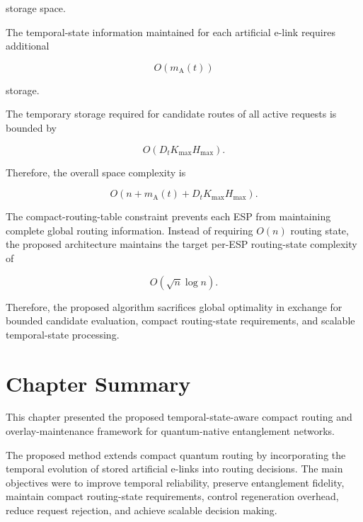 storage space.

The temporal-state information maintained for each artificial e-link requires additional

\begin{equation}
    O
    \left(
    m_{\mathrm{A}}(t)
    \right)
\end{equation}

storage.

The temporary storage required for candidate routes of all active requests is bounded by

\begin{equation}
    O
    \left(
    D_t
    K_{\max}
    H_{\max}
    \right).
\end{equation}

Therefore, the overall space complexity is

\begin{equation}
    O
    \left(
    n
    +
    m_{\mathrm{A}}(t)
    +
    D_t
    K_{\max}
    H_{\max}
    \right).
\end{equation}

The compact-routing-table constraint prevents each ESP from maintaining complete global routing information. Instead of requiring $O(n)$ routing state, the proposed architecture maintains the target per-ESP routing-state complexity of

\begin{equation}
    O
    \left(
    \sqrt{n}
    \log n
    \right).
\end{equation}

Therefore, the proposed algorithm sacrifices global optimality in exchange for bounded candidate evaluation, compact routing-state requirements, and scalable temporal-state processing.

\section{Chapter Summary}

This chapter presented the proposed temporal-state-aware compact routing and overlay-maintenance framework for quantum-native entanglement networks.

The proposed method extends compact quantum routing by incorporating the temporal evolution of stored artificial e-links into routing decisions. The main objectives were to improve temporal reliability, preserve entanglement fidelity, maintain compact routing-state requirements, control regeneration overhead, reduce request rejection, and achieve scalable decision making.

